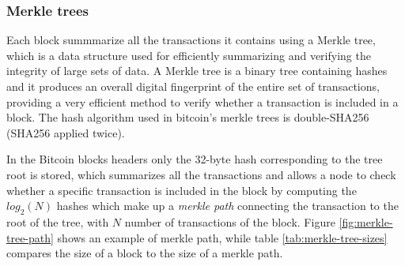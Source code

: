 \begin{table}[h!]
\centering
{}
\caption{Structure of a Bitcoin block header}
\label{tab:bloock-header-structure}
\end{table}


\subsubsection{Merkle trees} Each block summmarize all the transactions it
contains using a Merkle tree, which is a data structure used for efficiently
summarizing and verifying the integrity of large sets of data. A Merkle tree  is
a binary tree containing hashes and it produces an overall digital fingerprint
of the entire set of transactions, providing a very efficient method to verify
whether a transaction is included in a block. The hash algorithm used in
bitcoin’s merkle trees is double-SHA256 (SHA256 applied twice).

In the Bitcoin blocks headers only the 32-byte hash corresponding to the tree
root is stored, which summarizes all the transactions and allows a node to check
whether a specific transaction is included in the block by computing the
$log_2(N)$ hashes which make up a \emph{merkle path} connecting the transaction
to the root of the tree, with $N$ number of transactions of the block. Figure
\ref{fig:merkle-tree-path} shows an example of merkle path, while table
\ref{tab:merkle-tree-sizes} compares the size of a block to the size of a merkle
path.

